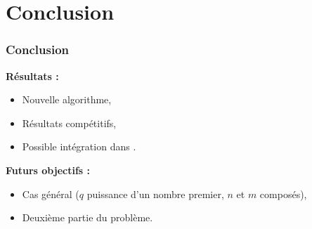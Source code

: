 \documentclass{beamer} %
\numberwithin{equation}{section}
\begin{document}
\section{Conclusion}
\begin{frame}
\frametitle{Conclusion}
\textbf{Résultats :}
\begin{itemize}
	\item Nouvelle algorithme,
	\item Résultats compétitifs,
	\item Possible intégration dans .
\end{itemize}
\vspace{0.3cm}
\textbf{Futurs objectifs :}
\begin{itemize}
	\item Cas général ($q$ puissance d'un nombre premier, $n$ et $m$ composés),
	\item Deuxième partie du problème.
\end{itemize}
\end{frame}
\end{document}
